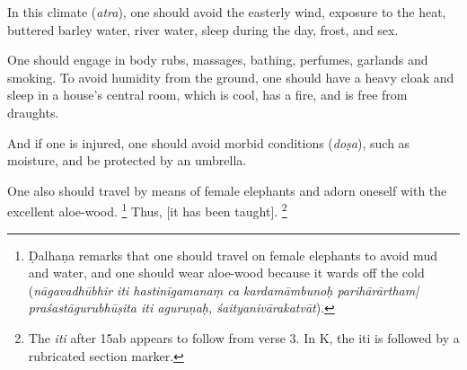 \begin{translation}
\item[12] %
In this climate (\emph{atra}), one should avoid the easterly wind, exposure to the heat, buttered barley water, river water, sleep during the day, frost, and sex.

\item[13--14ab] %
One should engage in body rubs, massages, bathing, perfumes, garlands and smoking. To avoid humidity from the ground, one should have a heavy cloak and sleep in a house's central room, which is cool, has a fire, and is free from draughts.
%

\item[14cd] %
And if one is injured, one should avoid morbid conditions (\emph{doṣa}), such as moisture, and be protected by an umbrella.

\item[15ab]
One also should travel by means of female elephants and adorn oneself with the excellent aloe-wood.%
	\footnote{Ḍalhaṇa \citep[809]{vulgate} remarks that one should travel on female elephants to avoid mud and water, and one should wear aloe-wood because it wards off the cold (\emph{nāgavadhūbhir iti hastinīgamanaṃ ca kardamāmbunoḥ parihārārtham| praśastāgurubhūṣita iti aguruṇaḥ, śaityanivārakatvāt}).} %
Thus, [it has been taught].%
	\footnote{The \emph{iti} after 15ab appears to follow from verse 3. In K, the iti is followed by a rubricated section marker.}\\

%


\end{translation}
